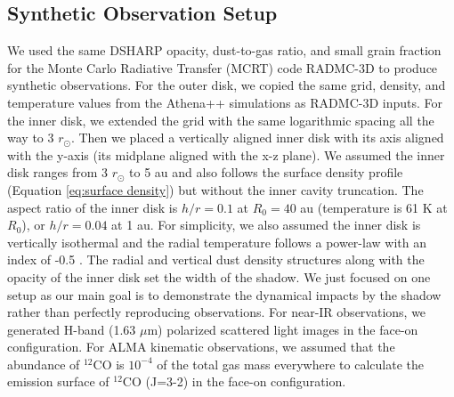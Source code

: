\documentclass[twocolumn,tighten]{aastex631}
\begin{document}
\subsection{Synthetic Observation Setup}
We used the same DSHARP opacity, dust-to-gas ratio, and small grain fraction for the Monte Carlo Radiative Transfer (MCRT) code RADMC-3D \citep{dullemond12} to produce synthetic observations. For the outer disk, we copied the same grid, density, and temperature values from the Athena++ simulations as RADMC-3D inputs. For the inner disk, we extended the grid with the same logarithmic spacing all the way to 3 $r_\odot$. Then we placed a vertically aligned inner disk with its axis aligned with the y-axis (its midplane aligned with the x-z plane). We assumed the inner disk ranges from 3 $r_\odot$ to 5 au and also follows the surface density profile (Equation \ref{eq:surface density}) but without the inner cavity truncation. The aspect ratio of the inner disk is $h/r = 0.1$ at $R_0 = 40$ au (temperature is 61 K at $R_0$), or $h/r = 0.04$ at 1 au. For simplicity, we also assumed the inner disk is vertically isothermal and the radial temperature follows a power-law with an index of -0.5 \citep[e.g.,][]{dullemond18}. The radial and vertical dust density structures along with the opacity of the inner disk set the width of the shadow. We just focused on one setup as our main goal is to demonstrate the dynamical impacts by the shadow rather than perfectly reproducing observations. For near-IR observations, we generated H-band (1.63 $\mu$m) polarized scattered light images in the face-on configuration. For ALMA kinematic observations, we assumed that the abundance of $^{12}$CO is $10^{-4}$ of the total gas mass everywhere to calculate the emission surface of $^{12}$CO (J=3-2) in the face-on configuration. 
\end{document}
